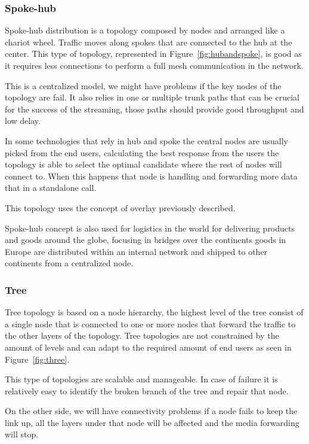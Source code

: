 \subsubsection{Spoke-hub}

Spoke-hub distribution is a topology composed by nodes and arranged like a chariot wheel. Traffic moves along spokes that are connected to the hub at the center. This type of topology, represented in Figure~\ref{fig:hubandspoke}, is good as it requires less connections to perform a full mesh communication in the network. 

This is a centralized model, we might have problems if the key nodes of the topology are fail. It also relies in one or multiple trunk paths that can be crucial for the success of the streaming, those paths should provide good throughput and low delay.

In some technologies that rely in hub and spoke the central nodes are usually picked from the end users, calculating the best response from the users the topology is able to select the optimal candidate where the rest of nodes will connect to. When this happens that node is handling and forwarding more data that in a standalone call.

This topology uses the concept of overlay previously described.

Spoke-hub concept is also used for logistics in the world for delivering products and goods around the globe, focusing in bridges over the continents goods in Europe are distributed within an internal network and shipped to other continents from a centralized node.  

\subsubsection{Tree}
 
Tree topology is based on a node hierarchy, the highest level of the tree consist of a single node that is connected to one or more nodes that forward the traffic to the other layers of the topology. Tree topologies are not constrained by the amount of levels and can adapt to the required amount of end users as seen in Figure~\ref{fig:three}.  

This type of topologies are scalable and manageable. In case of failure it is relatively easy to identify the broken branch of the tree and repair that node.

On the other side, we will have connectivity problems if a node fails to keep the link up, all the layers under that node will be affected and the media forwarding will stop.

